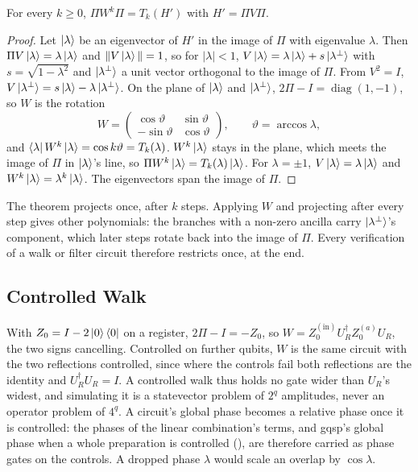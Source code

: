 \begin{theorem}
\label{thm:qubitisation}
For every $k\ge0$, $\Pi W^k\Pi=T_k(H')$ with $H'=\Pi V\Pi$.
\end{theorem}
\begin{proof}
Let $\ket\lambda$ be an eigenvector of $H'$ in the image of $\Pi$ with eigenvalue $\lambda$. Then $\Pi V\ket\lambda=\lambda\ket\lambda$ and $\|V\ket\lambda\|=1$, so for $|\lambda|<1$, $V\ket\lambda=\lambda\ket\lambda+s\ket{\lambda^\perp}$ with $s=\sqrt{1-\lambda^2}$ and $\ket{\lambda^\perp}$ a unit vector orthogonal to the image of $\Pi$. From $V^2=I$, $V\ket{\lambda^\perp}=s\ket\lambda-\lambda\ket{\lambda^\perp}$. On the plane of $\ket\lambda$ and $\ket{\lambda^\perp}$, $2\Pi-I=\operatorname{diag}(1,-1)$, so $W$ is the rotation
\begin{equation*}
    W=\begin{pmatrix}\cos\vartheta&\sin\vartheta\\-\sin\vartheta&\cos\vartheta\end{pmatrix},
    \qquad\vartheta=\arccos\lambda,
\end{equation*}
and $\bra\lambda W^k\ket\lambda=\cos k\vartheta=T_k(\lambda)$. $W^k\ket\lambda$ stays in the plane, which meets the image of $\Pi$ in $\ket\lambda$'s line, so $\Pi W^k\ket\lambda=T_k(\lambda)\ket\lambda$. For $\lambda=\pm1$, $V\ket\lambda=\lambda\ket\lambda$ and $W^k\ket\lambda=\lambda^k\ket\lambda$. The eigenvectors span the image of $\Pi$.
\end{proof}

The theorem projects once, after $k$ steps. Applying $W$ and projecting after every step gives other polynomials: the branches with a non-zero ancilla carry $\ket{\lambda^\perp}$'s component, which later steps rotate back into the image of $\Pi$. Every verification of a walk or filter circuit therefore restricts once, at the end.

\subsection{Controlled Walk}
\label{app:controlled-walk}

With $Z_0=I-2\ket0\bra0$ on a register, $2\Pi-I=-Z_0$, so $W=Z_0^{(\mathrm{in})}U_R^\dagger Z_0^{(a)}U_R$, the two signs cancelling. Controlled on further qubits, $W$ is the same circuit with the two reflections controlled, since where the controls fail both reflections are the identity and $U_R^\dagger U_R=I$. A controlled walk thus holds no gate wider than $U_R$'s widest, and simulating it is a statevector problem of $2^q$ amplitudes, never an operator problem of $4^q$. A circuit's global phase becomes a relative phase once it is controlled: the phases of the linear combination's terms, and \gls{gqsp}'s global phase when a whole preparation is controlled (), are therefore carried as phase gates on the controls. A dropped phase $\lambda$ would scale an overlap by $\cos\lambda$.

